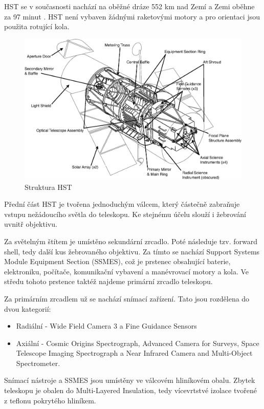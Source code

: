 \documentclass[a4paper,11pt]{article}
\begin{document}
HST se v současnosti nachází na oběžné dráze 552 km nad Zemí a Zemi oběhne za 97 minut \cite{hubblesiteFacts}. HST není vybaven žádnými raketovými motory a pro orientaci jsou použita rotující kola.

\begin{figure}[h]
	\begin{center}
		\includegraphics[width=16cm]{hst-structure.png}
		\caption{Struktura HST}
		\label{hst-structure}
	\end{center}
\end{figure}

Přední část HST je tvořena jednoduchým válcem, který částečně zabraňuje vstupu nežádoucího světla do teleskopu. Ke stejnému účelu slouží i žebrování uvnitř objektivu.

Za světelným štítem je umístěno sekundární zrcadlo. Poté následuje tzv. forward shell, tedy další kus žebrovaného objektivu. Za tímto se nachází Support Systems Module Equipment Section (SSMES), což je prstenec obsahující baterie, elektroniku, počítače, komunikační vybavení a manévrovací motory a kola. Ve středu tohoto prstence taktéž najdeme primární zrcadlo teleskopu.

Za primárním zrcadlem už se nachází snímací zařízení. Tato jsou rozdělena do dvou kategorií:
\begin{itemize}
	\item Radiální - Wide Field Camera 3 a Fine Guidance Sensors
	\item Axiální - Cosmic Origins Spectrograph, Advanced Camera for Surveys, Space Telescope Imaging Spectrograph a Near Infrared Camera and Multi-Object Spectrometer.
\end{itemize}

Snímací nástroje a SSMES jsou umístěny ve válcovém hliníkovém obalu. Zbytek teleskopu je obalen do Multi-Layered Insulation, tedy vícevrtstvé izolace tvořené z teflonu pokrytého hliníkem.
\end{document}
